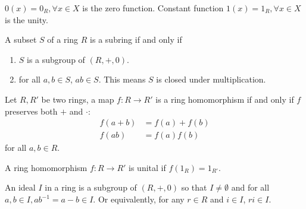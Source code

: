 \documentclass[10pt]{article}
\begin{document}
\begin{remark}
    $0(x)=0_{R}, \forall x\in X$ is the zero function. Constant function $1(x)=1_{R}, \forall x\in X$ is the unity.
\end{remark}
\begin{hdefinition}[subring]
    A subset $S$ of a ring $R$ is a subring if and only if 
    \begin{enumerate}
        \item $S$ is a subgroup of $(R,+,0)$.
        \item for all $a,b\in S$, $ab\in S$. This means $S$ is closed under multiplication. 
    \end{enumerate}
\end{hdefinition}
\begin{hdefinition}
    Let $R,R'$ be two rings, a map $f: R\to R'$ is a ring homomorphism if and only if $f$ preserves both $+$ and $\cdot$:
    \begin{align*}
        f(a+b)&=f(a)+f(b)\\
        f(ab)&=f(a)f(b)
    \end{align*}
    for all $a,b\in R$.
\end{hdefinition}
\begin{hdefinition}
    A ring homomorphism $f:R\to R'$ is unital if $f(1_R)=1_{R'}$.
\end{hdefinition}
\begin{hdefinition}[ideal]
    An ideal $I$ in a ring is a subgroup of $(R,+,0)$ so that  $I\neq\emptyset$ and  for all $a,b\in I,ab^{-1}=a-b\in I$. Or equivalently, for any $r\in R$ and $i\in I$, $ri\in I$.
\end{hdefinition}





\newpage
\end{document}
